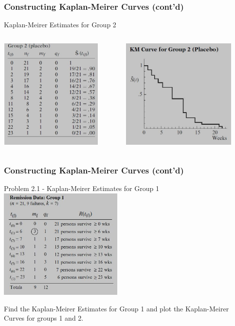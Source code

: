 \documentclass{beamer}
\theoremstyle{definition}
\begin{document}
\begin{frame}
\frametitle{Constructing Kaplan-Meirer Curves (cont'd)}
\begin{block}{Kaplan-Meirer Estimates for Group 2}
\begin{columns}
    \begin{column}{0.48\textwidth}
        \includegraphics[width =\textwidth, height=5.5cm]{Ch2_KMGP2.JPG}
    \end{column}
    \hspace{-10pt}
    \begin{column}{0.48\textwidth}
         \includegraphics[width =\textwidth, height=5.5cm]{Ch2_KMCGP2.JPG}
    \end{column}
\end{columns}
\end{block}
\end{frame}

\begin{frame}
\frametitle{Constructing Kaplan-Meirer Curves (cont'd)}
\begin{block}{Problem 2.1 - Kaplan-Meirer Estimates for Group 1}
         \includegraphics[width =\textwidth, height=5.5cm]{Ch1-leuk_data_a1.JPG}
\end{block}
Find the Kaplan-Meirer Estimates for Group 1 and plot the Kaplan-Meirer Curves for groups 1 and 2.
\end{frame}
\end{document}
